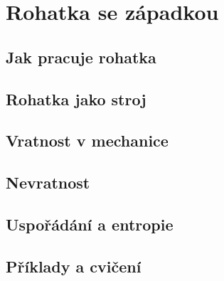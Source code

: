 \chapter{Rohatka se západkou}\label{fyz:IchapXLVI}
\minitoc
  \section{Jak pracuje rohatka}\label{fyz:IchapXLVIsecI}
  \section{Rohatka jako stroj}\label{fyz:IchapXLVIsecII}
  \section{Vratnost v mechanice}\label{fyz:IchapXLVIsecIII}
  \section{Nevratnost}\label{fyz:IchapXLVIsecIV}
  \section{Uspořádání a entropie}\label{fyz:IchapXLVIsecV}
  \section{Příklady a cvičení}\label{fyz:IchapXLVIsecVI}